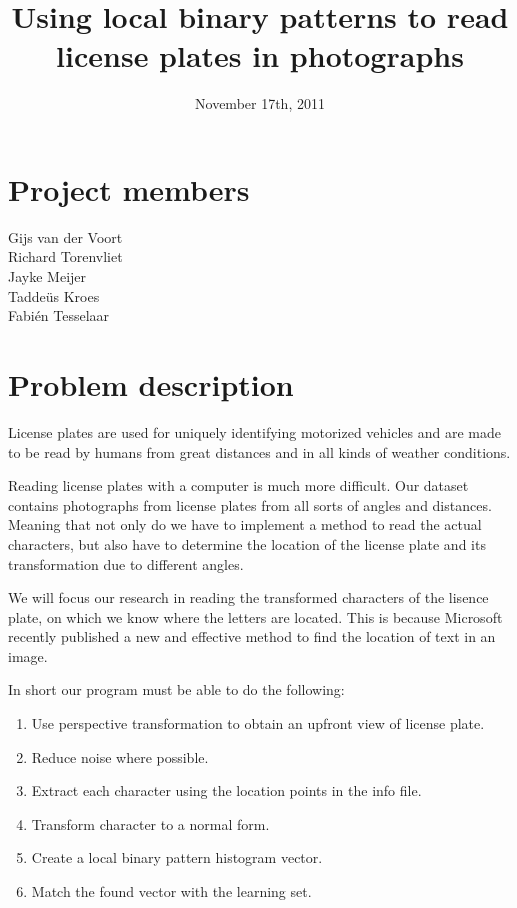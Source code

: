 \documentclass[a4paper]{article}
\title{Using local binary patterns to read license plates in photographs}
\date{November 17th, 2011}
\begin{document}
\maketitle

\section*{Project members}
Gijs van der Voort\\
Richard Torenvliet\\
Jayke Meijer\\
Tadde\"us Kroes\\
Fabi\'en Tesselaar

\tableofcontents
\setcounter{secnumdepth}{1}

\section{Problem description}

License plates are used for uniquely identifying motorized vehicles and are 
made to be read by humans from great distances and in all kinds of weather 
conditions.

Reading license plates with a computer is much more difficult. Our dataset
contains photographs from license plates from all sorts of angles and distances. 
Meaning that not only do we have to implement a method to read the actual 
characters, but also have to determine the location of the license plate and its
transformation due to different angles.

We will focus our research in reading the transformed characters of the 
lisence plate, on which we know where the letters are located. This is because
Microsoft recently published a new and effective method to find the location of 
text in an image.

In short our program must be able to do the following:

\begin{enumerate}
\item Use perspective transformation to obtain an upfront view of license plate.
\item Reduce noise where possible.
\item Extract each character using the location points in the info file.
\item Transform character to a normal form. 
\item Create a local binary pattern histogram vector.
\item Match the found vector with the learning set.
\end{enumerate}
\end{document}
